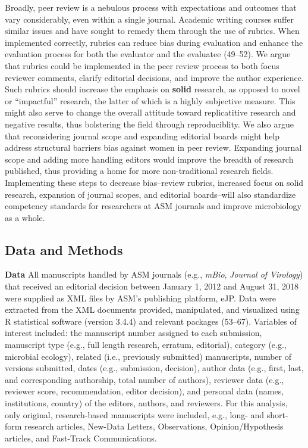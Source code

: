 \documentclass[11pt,]{article}
\begin{document}
Broadly, peer review is a nebulous process with expectations and
outcomes that vary considerably, even within a single journal. Academic
writing courses suffer similar issues and have sought to remedy them
through the use of rubrics. When implemented correctly, rubrics can
reduce bias during evaluation and enhance the evaluation process for
both the evaluator and the evaluatee (49--52). We argue that rubrics
could be implemented in the peer review process to both focus reviewer
comments, clarify editorial decisions, and improve the author
experience. Such rubrics should increase the emphasis on \textbf{solid}
research, as opposed to novel or ``impactful'' research, the latter of
which is a highly subjective measure. This might also serve to change
the overall attitude toward replicatitive research and negative results,
thus bolstering the field through reproduciblity. We also argue that
reconsidering journal scope and expanding editorial boards might help
address structural barriers bias against women in peer review. Expanding
journal scope and adding more handling editors would improve the breadth
of research published, thus providing a home for more non-traditional
research fields. Implementing these steps to decrease bias--review
rubrics, increased focus on solid research, expansion of journal scopes,
and editorial boards--will also standardize competency standards for
researchers at ASM journals and improve microbiology as a whole.

\subsection{Data and Methods}\label{data-and-methods}

\textbf{Data} All manuscripts handled by ASM journals (e.g.,
\emph{mBio}, \emph{Journal of Virology}) that received an editorial
decision between January 1, 2012 and August 31, 2018 were supplied as
XML files by ASM's publishing platform, eJP. Data were extracted from
the XML documents provided, manipulated, and visualized using R
statistical software (version 3.4.4) and relevant packages (53--67).
Variables of interest included: the manuscript number assigned to each
submission, manuscript type (e.g., full length research, erratum,
editorial), category (e.g., microbial ecology), related (i.e.,
previously submitted) manuscripts, number of versions submitted, dates
(e.g., submission, decision), author data (e.g., first, last, and
corresponding authorship, total number of authors), reviewer data (e.g.,
reviewer score, recommendation, editor decision), and personal data
(names, institutions, country) of the editors, authors, and reviewers.
For this analysis, only original, research-based manuscripts were
included, e.g., long- and short-form research articles, New-Data
Letters, Observations, Opinion/Hypothesis articles, and Fast-Track
Communications.
\end{document}
